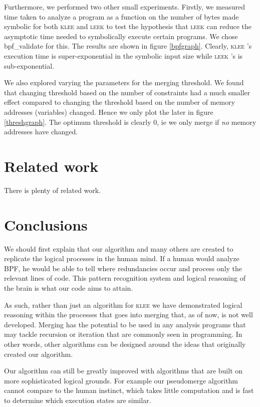 \documentclass[12pt,a4paper]{article}
\newcommand{\klee}{\textsc{klee }}
\newcommand{\leek}{\textsc{leek }}
\begin{document}
Furthermore, we performed two other small experiments. Firstly, we measured time taken to analyze a program as a function on the number of bytes made symbolic for both \klee and \leek to test the hypothesis that \leek can reduce the asymptotic time needed to symbolically execute certain programs. We chose bpf\_validate for this. The results are shown in figure \ref{bpfgraph}. Clearly, \klee's execution time is super-exponential in the symbolic input size while \leek's is sub-exponential.

We also explored varying the parameters for the merging threshold. We found that changing threshold based on the number of constraints had a much smaller effect compared to changing the threshold based on the number of memory addresses (variables) changed. Hence we only plot the later in figure \ref{threshgraph}. The optimum threshold is clearly 0, ie we only merge if \emph{no} memory addresses have changed.

\section{Related work}\label{related}
There is plenty of related work.

\section{Conclusions}\label{conclusions}
We should first explain that our algorithm and many others are created to replicate the logical processes in the human mind. If a human would analyze BPF, he would be able to tell where redundancies occur and process only the relevant lines of code. This pattern recognition system and logical reasoning of the brain is what our code aims to attain.

As such, rather than just an algorithm for \klee we have demonstrated logical reasoning within the processes that goes into merging that, as of now, is not well developed. Merging has the potential to be used in any analysis programs that may tackle recursion or iteration that are commonly seen in programming. In other words, other algorithms can be designed around the ideas that originally created our algorithm.

Our algorithm can still be greatly improved with algorithms that are built on more sophisticated logical grounds. For example our pseudomerge algorithm cannot compare to the human instinct, which takes little computation and is fast to determine which execution states are similar.
\end{document}
